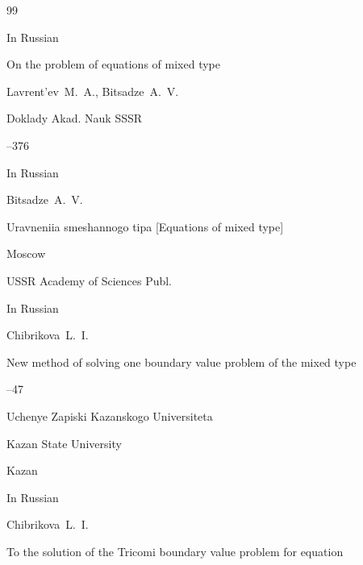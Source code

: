\newpage



\begin{thebibliography}{99}




\lang In Russian

\paper On the problem of equations of mixed type

\by Lavrent'ev~M.~A., Bitsadze~A.~V.

\jour Doklady Akad. Nauk SSSR




--376





\lang In Russian

\by Bitsadze~A.~V. 

\book Uravneniia smeshannogo tipa \rm [Equations of mixed type]

\publaddr Moscow

\publ USSR Academy of Sciences Publ.








\lang In Russian

\by Chibrikova~L.~I.

\paper New method of solving one boundary value problem of the mixed type




--47

\serial Uchenye Zapiski Kazanskogo Universiteta

\publ Kazan State University

\publaddr Kazan








\lang In Russian

\by Chibrikova~L.~I.

\paper To the solution of the Tricomi boundary value problem for equation


\end{thebibliography}

